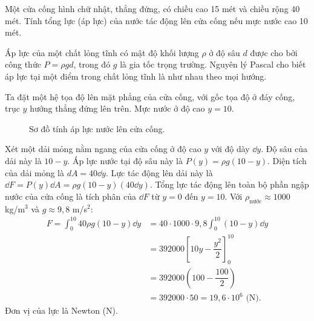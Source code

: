 \begin{example}
    Một cửa cống hình chữ nhật, thẳng đứng, có chiều cao 15 mét và chiều rộng 40 mét. Tính tổng lực (áp lực) của nước tác động lên cửa cống nếu mực nước cao 10 mét.
\end{example}
\begin{solution}
    Áp lực của một chất lỏng tĩnh có mật độ khối lượng $\rho$ ở độ sâu $d$ được cho bởi công thức $P = \rho g d$, trong đó $g$ là gia tốc trọng trường. Nguyên lý Pascal cho biết áp lực tại một điểm trong chất lỏng tĩnh là như nhau theo mọi hướng.
    
    Ta đặt một hệ tọa độ lên mặt phẳng của cửa cống, với gốc tọa độ ở đáy cống, trục $y$ hướng thẳng đứng lên trên. Mực nước ở độ cao $y=10$.
        
    \begin{figure}[H]
        \centering
        \caption{Sơ đồ tính áp lực nước lên cửa cống.}
    \end{figure}
    
    Xét một dải mỏng nằm ngang của cửa cống ở độ cao $y$ với độ dày $\dd y$. Độ sâu của dải này là $10-y$. Áp lực nước tại độ sâu này là $P(y) = \rho g (10-y)$.
    Diện tích của dải mỏng là $dA = 40 \dd y$. Lực tác động lên dải này là $\dd F = P(y) \dd A = \rho g (10-y) (40 \dd y)$.
    Tổng lực tác động lên toàn bộ phần ngập nước của cửa cống là tích phân của $\dd F$ từ $y=0$ đến $y=10$. Với $\rho_{\text{nước}} \approx 1000$ kg/m$^3$ và $g \approx 9,8$ m/s$^2$:
    \begin{align*}
        F = \int_0^{10} 40 \rho g (10-y) \dd y &= 40 \cdot 1000 \cdot 9,8 \int_0^{10} (10-y) \dd y \\
        &= 392000 \left[ 10y - \dfrac{y^2}{2} \right]_0^{10} \\
        &= 392000 \left( 100 - \dfrac{100}{2} \right) \\
        &= 392000 \cdot 50 = 19,6 \cdot 10^6 \text{ (N)}.
    \end{align*}
    Đơn vị của lực là Newton (N).
\end{solution}

